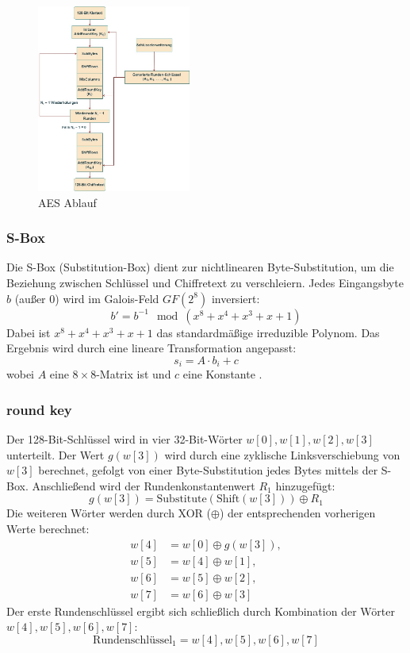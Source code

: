 \begin{figure}[H]
	\centering
	\includegraphics[width=0.45\textwidth]{sections/matheo/final.jpg}
	\caption{AES Ablauf}
	\label{fig:qualen_AES}
\end{figure}



\subsubsection{S-Box}
Die S-Box (Substitution-Box) dient zur nichtlinearen Byte-Substitution, um die Beziehung zwischen Schlüssel und Chiffretext zu verschleiern. Jedes Eingangsbyte \(b\) (außer 0) wird im Galois-Feld \(GF(2^8)\) inversiert:
\[
b' = b^{-1} \mod (x^8 + x^4 + x^3 + x + 1)
\]
Dabei ist \(x^8 + x^4 + x^3 + x + 1\) das standardmäßige irreduzible Polynom. Das Ergebnis wird durch eine lineare Transformation angepasst:
\[
s_i = A \cdot b_i + c
\]
wobei \(A\) eine $8 \times 8$-Matrix ist und \(c\) eine Konstante \cite{Endliche_körper} \cite{S_Box}.

\subsubsection{round key}

Der 128-Bit-Schlüssel wird in vier 32-Bit-Wörter $w[0], w[1], w[2], w[3]$ unterteilt. 
Der Wert $g(w[3])$ wird durch eine zyklische Linksverschiebung von $w[3]$ berechnet, 
gefolgt von einer Byte-Substitution jedes Bytes mittels der S-Box. Anschließend wird 
der Rundenkonstantenwert $R_1$ hinzugefügt:
\[
g(w[3]) = \text{Substitute}(\text{Shift}(w[3])) \oplus R_1
\]
Die weiteren Wörter werden durch XOR ($\oplus$) der entsprechenden vorherigen Werte berechnet:
\begin{align*}
w[4] &= w[0] \oplus g(w[3]), \\
w[5] &= w[4] \oplus w[1], \\
w[6] &= w[5] \oplus w[2], \\
w[7] &= w[6] \oplus w[3]
\end{align*}
Der erste Rundenschlüssel ergibt sich schließlich durch Kombination der Wörter $w[4], w[5], w[6], w[7]$:
\[
\text{Rundenschlüssel}_1 = w[4], w[5], w[6], w[7]
\]

